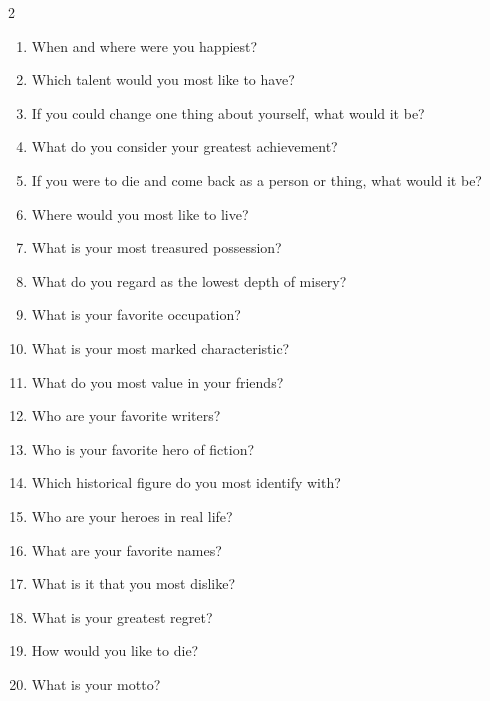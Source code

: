 \documentclass[11pt, a4paper]{article}
\begin{document}
\begin{multicols}{2}
\begin{enumerate}[leftmargin=0.5em, itemsep=0.3em, label=\textbf{\arabic*.}]
    \hrulefill
    \item When and where were you happiest?

    \hrulefill
    \item Which talent would you most like to have?

    \hrulefill
    \item If you could change one thing about yourself, what would it be?

    \hrulefill
    \item What do you consider your greatest achievement?

    \hrulefill
    \item If you were to die and come back as a person or thing, what would it be?

    \hrulefill
    \item Where would you most like to live?

    \hrulefill
    \item What is your most treasured possession?

    \hrulefill
    \item What do you regard as the lowest depth of misery?

    \hrulefill
    \item What is your favorite occupation?

    \hrulefill
    \item What is your most marked characteristic?

    \hrulefill
    \item What do you most value in your friends?

    \hrulefill
    \item Who are your favorite writers?

    \hrulefill
    \item Who is your favorite hero of fiction?

    \hrulefill
    \item Which historical figure do you most identify with?

    \hrulefill
    \item Who are your heroes in real life?

    \hrulefill
    \item What are your favorite names?

    \hrulefill
    \item What is it that you most dislike?

    \hrulefill
    \item What is your greatest regret?

    \hrulefill
    \item How would you like to die?

    \hrulefill
    \item What is your motto?

    \hrulefill
\end{enumerate}
\end{multicols}

\restoregeometry
\end{document}

